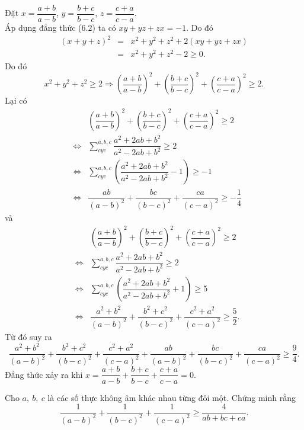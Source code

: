{\begin{bt}
{		Đặt $ x=\dfrac{a+b}{a-b} $, $ y=\dfrac{b+c}{b-c} $, $ z=\dfrac{c+a}{c-a} $.\\
		Áp dụng đẳng thức ($ 6.2 $) ta có $ xy+yz+zx=-1 $. Do đó
		\begin{eqnarray*}
			(x+y+z)^{2}&=&x^{2}+y^{2}+z^{2}+2(xy+yz+zx)\\
			&=&x^{2}+y^{2}+z^{2}-2\geq 0.
		\end{eqnarray*}
		Do đó
		\[ 
		x^{2}+y^{2}+z^{2}\geq 2\Rightarrow \left(\dfrac{a+b}{a-b}\right)^{2}+\left(\dfrac{b+c}{b-c}\right)^{2}+\left(\dfrac{c+a}{c-a}\right)^{2}\geq 2.
		\]
		Lại có
		\begin{eqnarray*}
			&&\left(\dfrac{a+b}{a-b}\right)^{2}+\left(\dfrac{b+c}{b-c}\right)^{2}+\left(\dfrac{c+a}{c-a}\right)^{2}\geq 2\\
			&\Leftrightarrow&\displaystyle\sum\limits_{cyc}^{a,b,c}\dfrac{a^{2}+2ab+b^{2}}{a^{2}-2ab+b^{2}}\geq 2\\
			&\Leftrightarrow&\displaystyle\sum\limits_{cyc}^{a,b,c}\left( \dfrac{a^{2}+2ab+b^{2}}{a^{2}-2ab+b^{2}}-1\right) \geq -1\\
			&\Leftrightarrow&\dfrac{ab}{(a-b)^{2}}+\dfrac{bc}{(b-c)^{2}}+\dfrac{ca}{(c-a)^{2}}\geq -\dfrac{1}{4}
		\end{eqnarray*}
		và
		\begin{eqnarray*}
			&&\left(\dfrac{a+b}{a-b}\right)^{2}+\left(\dfrac{b+c}{b-c}\right)^{2}+\left(\dfrac{c+a}{c-a}\right)^{2}\geq 2\\
			&\Leftrightarrow&\displaystyle\sum\limits_{cyc}^{a,b,c}\dfrac{a^{2}+2ab+b^{2}}{a^{2}-2ab+b^{2}}\geq 2\\
			&\Leftrightarrow&\displaystyle\sum\limits_{cyc}^{a,b,c}\left( \dfrac{a^{2}+2ab+b^{2}}{a^{2}-2ab+b^{2}}+1\right) \geq 5\\
			&\Leftrightarrow&\dfrac{a^{2}+b^{2}}{(a-b)^{2}}+\dfrac{b^{2}+c^{2}}{(b-c)^{2}}+\dfrac{c^{2}+a^{2}}{(c-a)^{2}}\geq \dfrac{5}{2}.
		\end{eqnarray*}
		Từ đó suy ra 
		\[ 
		\dfrac{a^{2}+b^{2}}{(a-b)^{2}}+\dfrac{b^{2}+c^{2}}{(b-c)^{2}}+\dfrac{c^{2}+a^{2}}{(c-a)^{2}}+\dfrac{ab}{(a-b)^{2}}+\dfrac{bc}{(b-c)^{2}}+\dfrac{ca}{(c-a)^{2}}\geq \dfrac{9}{4}.
		\]
		Đẳng thức xảy ra khi $ x=\dfrac{a+b}{a-b}+\dfrac{b+c}{b-c}+\dfrac{c+a}{c-a}=0 $.
	}
\end{bt}
\begin{bt}%
	Cho $ a,\ b,\ c $ là các số thực không âm khác nhau từng đôi một. Chứng minh rằng
	\[ 
	\dfrac{1}{(a-b)^{2}}+\dfrac{1}{(b-c)^{2}}+\dfrac{1}{(c-a)^{2}}\geq \dfrac{4}{ab+bc+ca}.
\]
\end{bt}}

